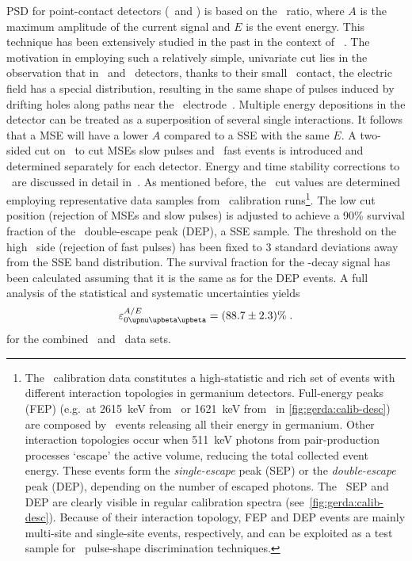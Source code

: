PSD for point-contact detectors (\bege\ and \icoax) is based on the \aoe\ ratio, where $A$
is the maximum amplitude of the current signal and $E$ is the event energy. This technique
has been extensively studied in the past in the context of \gerda~\cite{Agostini2013,
Agostini2010, Budjas2008, Budjas2009, Budjas2009a, Agostini2010a}. The motivation in
employing such a relatively simple, univariate cut lies in the observation that in
\bege\ and \icoax\ detectors, thanks to their small \pplus\ contact, the electric field
has a special distribution, resulting in the same shape of pulses induced by drifting
holes along paths near the \pplus\ electrode~\cite{Agostini2010}. Multiple energy
depositions in the detector can be treated as a superposition of several single
interactions. It follows that a MSE will have a lower $A$ compared to a SSE with the
same $E$.  A two-sided cut on \aoe\ to cut MSEs slow pulses and \pplus\ fast events is
introduced and determined separately for each detector. Energy and time stability
corrections to \aoe\ are discussed in detail in~\cite{Agostini2021a}. As mentioned before,
the \aoe\ cut values are determined employing representative data samples from \Th\
calibration runs\footnote{%
  The \Th\ calibration data constitutes a high-statistic and rich set of events with
  different interaction topologies in germanium detectors. Full-energy peaks (FEP)
  (e.g.~at 2615~keV from \Tl\ or 1621~keV from \Bil\ in \cref{fig:gerda:calib-desc}) are
  composed by \g\ events releasing all their energy in germanium. Other interaction
  topologies occur when 511~keV photons from pair-production processes `escape' the active
  volume, reducing the total collected event energy. These events form the
  \emph{single-escape} peak (SEP) or the \emph{double-escape} peak (DEP), depending on the
  number of escaped photons. The \Tl\ SEP and DEP are clearly visible in regular
  calibration spectra (see~\cref{fig:gerda:calib-desc}). Because of their interaction
  topology, FEP and DEP events are mainly multi-site and single-site events, respectively,
  and can be exploited as a test sample for \onbb\ pulse-shape discrimination techniques.
}. The low cut position (rejection of MSEs and slow pulses) is adjusted
to achieve a 90\% survival fraction of the \Tl\ double-escape peak (DEP), a SSE sample. The
threshold on the high \aoe\ side (rejection of fast pulses) has been fixed to 3 standard
deviations away from the SSE band distribution. The survival fraction for the
\onbb-decay signal has been calculated assuming that it is the same as for the DEP
events. A full analysis of the statistical and systematic uncertainties yields
\[
  \epsilon_\onbbM^{A/E} = (88.7 \pm 2.3)\% \;.
\]
for the combined \bege\ and \icoax\ data sets.


